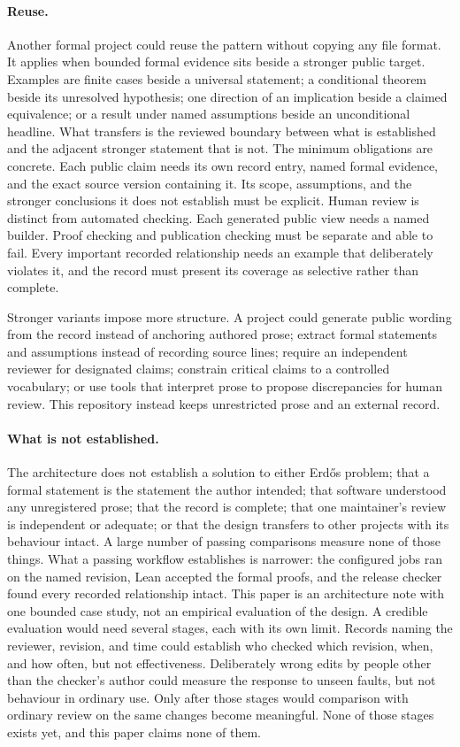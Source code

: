 \documentclass[11pt]{article}
\begin{document}
\paragraph{Reuse.}
Another formal project could reuse the pattern without copying any file
format.  It applies when bounded formal evidence sits beside a stronger public
target.  Examples are finite cases beside a universal statement;
a conditional theorem beside its unresolved hypothesis; one direction of an
implication beside a claimed equivalence; or a result under named assumptions beside an unconditional
headline.  What transfers is the reviewed boundary between what is established
and the adjacent stronger statement that is not.  The minimum obligations are concrete.
Each public claim needs its own record entry, named formal evidence, and the
exact source version containing it.  Its scope, assumptions, and the stronger
conclusions it does not establish must be explicit.
Human review is distinct from automated checking.  Each generated
public view needs a named builder.  Proof checking and publication
checking must be separate and able to fail.  Every important recorded
relationship needs an example that deliberately violates it, and the record
must present its coverage as selective rather than complete.

Stronger variants impose more structure.  A project could generate public
wording from the record instead of anchoring authored prose; extract formal
statements and assumptions instead of recording source lines; require an
independent reviewer for designated claims; constrain critical claims to a
controlled vocabulary; or use tools that interpret prose to propose discrepancies for
human review.  This repository instead keeps unrestricted prose and an
external record.

\paragraph{What is not established.}
The architecture does not
establish a solution to either Erd\H{o}s problem; that a formal statement is
the statement the author intended; that software understood any unregistered
prose; that the record is complete; that one maintainer's review is
independent or adequate; or that the design transfers to other projects with
its behaviour intact.  A large number of passing comparisons measure none of
those things.  What a passing workflow establishes is narrower: the
configured jobs ran on the named revision, Lean accepted the formal proofs,
and the release checker found every recorded relationship intact.  This paper
is an architecture note with one bounded case study,
not an empirical evaluation of the design.  A credible evaluation would need
several stages, each with its own limit.  Records naming the reviewer, revision,
and time could establish who checked which revision, when, and how often, but
not effectiveness.  Deliberately wrong edits by people other than the checker's
author could measure the response to unseen faults, but not
behaviour in ordinary use.  Only after those stages would comparison with ordinary review
on the same changes become meaningful.  None of those stages exists yet, and
this paper claims none of them.
\end{document}

